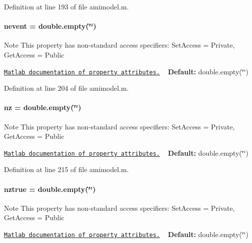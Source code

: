 Definition at line 193 of file amimodel.\+m.

\hypertarget{classamimodel_aab5c7f06273122b68624eb3bca6a9b6e}{}
\paragraph[{nevent}]{\setlength{\rightskip}{0pt plus 5cm}nevent = double.\+empty(\char`\"{}\char`\"{})}\label{classamimodel_aab5c7f06273122b68624eb3bca6a9b6e}
\begin{DoxyNote}{Note}
This property has non-\/standard access specifiers\+: {\ttfamily Set\+Access = Private, Get\+Access = Public} 

\href{http://www.mathworks.com/help/matlab/matlab_oop/property-attributes.html}{\tt Matlab documentation of property attributes.} ~\newline
{\bfseries Default\+:} double.\+empty(\char`\"{}\char`\"{}) 
\end{DoxyNote}


Definition at line 204 of file amimodel.\+m.

\hypertarget{classamimodel_a79f11413e5bfe18a0e71e17574399ad5}{}
\paragraph[{nz}]{\setlength{\rightskip}{0pt plus 5cm}nz = double.\+empty(\char`\"{}\char`\"{})}\label{classamimodel_a79f11413e5bfe18a0e71e17574399ad5}
\begin{DoxyNote}{Note}
This property has non-\/standard access specifiers\+: {\ttfamily Set\+Access = Private, Get\+Access = Public} 

\href{http://www.mathworks.com/help/matlab/matlab_oop/property-attributes.html}{\tt Matlab documentation of property attributes.} ~\newline
{\bfseries Default\+:} double.\+empty(\char`\"{}\char`\"{}) 
\end{DoxyNote}


Definition at line 215 of file amimodel.\+m.

\hypertarget{classamimodel_a364ecd990baeeefd1de3e6795cd50a58}{}
\paragraph[{nztrue}]{\setlength{\rightskip}{0pt plus 5cm}nztrue = double.\+empty(\char`\"{}\char`\"{})}\label{classamimodel_a364ecd990baeeefd1de3e6795cd50a58}
\begin{DoxyNote}{Note}
This property has non-\/standard access specifiers\+: {\ttfamily Set\+Access = Private, Get\+Access = Public} 

\href{http://www.mathworks.com/help/matlab/matlab_oop/property-attributes.html}{\tt Matlab documentation of property attributes.} ~\newline
{\bfseries Default\+:} double.\+empty(\char`\"{}\char`\"{}) 
\end{DoxyNote}


